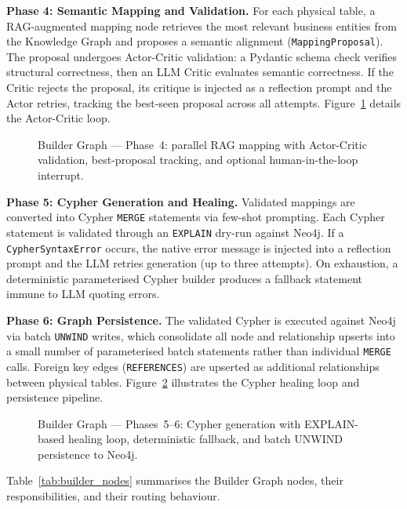 \textbf{Phase 4: Semantic Mapping and Validation.} For each physical table, a RAG-augmented mapping node retrieves the most relevant business entities from the Knowledge Graph and proposes a semantic alignment (\texttt{MappingProposal}). The proposal undergoes Actor-Critic validation: a Pydantic schema check verifies structural correctness, then an LLM Critic evaluates semantic correctness. If the Critic rejects the proposal, its critique is injected as a reflection prompt and the Actor retries, tracking the best-seen proposal across all attempts. Figure~\ref{fig:sd:builder_p4} details the Actor-Critic loop.

\begin{figure}[htbp]
\centering
{}
\caption{Builder Graph --- Phase~4: parallel RAG mapping with Actor-Critic validation, best-proposal tracking, and optional human-in-the-loop interrupt.}
\label{fig:sd:builder_p4}
\end{figure}

\textbf{Phase 5: Cypher Generation and Healing.} Validated mappings are converted into Cypher \texttt{MERGE} statements via few-shot prompting. Each Cypher statement is validated through an \texttt{EXPLAIN} dry-run against Neo4j. If a \texttt{CypherSyntaxError} occurs, the native error message is injected into a reflection prompt and the LLM retries generation (up to three attempts). On exhaustion, a deterministic parameterised Cypher builder produces a fallback statement immune to LLM quoting errors.

\textbf{Phase 6: Graph Persistence.} The validated Cypher is executed against Neo4j via batch \texttt{UNWIND} writes, which consolidate all node and relationship upserts into a small number of parameterised batch statements rather than individual \texttt{MERGE} calls. Foreign key edges (\texttt{REFERENCES}) are upserted as additional relationships between physical tables. Figure~\ref{fig:sd:builder_p5} illustrates the Cypher healing loop and persistence pipeline.

\begin{figure}[htbp]
\centering
{}
\caption{Builder Graph --- Phases~5--6: Cypher generation with EXPLAIN-based healing loop, deterministic fallback, and batch UNWIND persistence to Neo4j.}
\label{fig:sd:builder_p5}
\end{figure}

Table~\ref{tab:builder_nodes} summarises the Builder Graph nodes, their responsibilities, and their routing behaviour.

